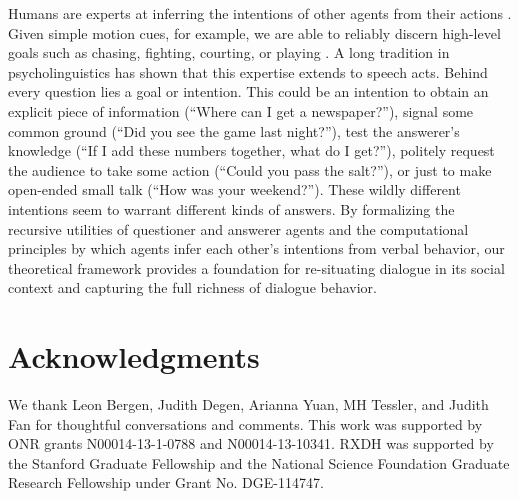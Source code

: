 \documentclass[12pt, floatsintext, jou]{apa6}
\begin{document}
Humans are experts at inferring the intentions of other agents from their actions \cite{TomaselloCarpenter___Moll05_IntentionsCulturalCognition, BakerSaxeTenenbaum09_ActionUnderstandingInversePlanning}. Given simple motion cues, for example, we are able to reliably discern high-level goals such as chasing, fighting, courting, or playing \cite{BarrettToddMillerBlythe05_IntentionFromMotionCues, HeiderSimmel44_Animacy}. A long tradition in psycholinguistics has shown that this expertise extends to speech acts.  Behind every question lies a goal or intention. This could be an intention to obtain an explicit piece of information (``Where can I get a newspaper?''), signal some common ground (``Did you see the game last night?''), test the answerer's knowledge (``If I add these numbers together, what do I get?''), politely request the audience to take some action (``Could you pass the salt?''), or just to make open-ended small talk (``How was your weekend?''). These wildly different intentions seem to warrant different kinds of answers. %
By formalizing the recursive utilities of questioner and answerer agents and the computational principles by which agents infer each other's intentions from verbal behavior, our theoretical framework provides a foundation for re-situating dialogue in its social context and capturing the full richness of dialogue behavior.

\section{\bf Acknowledgments}
\small
\noindent We thank Leon Bergen, Judith Degen, Arianna Yuan, MH Tessler, and Judith Fan for thoughtful conversations and comments. This work was supported by ONR grants N00014-13-1-0788 and N00014-13-10341. RXDH was supported by the Stanford Graduate Fellowship and the National Science Foundation Graduate Research Fellowship under Grant No. DGE-114747.



\end{document}
